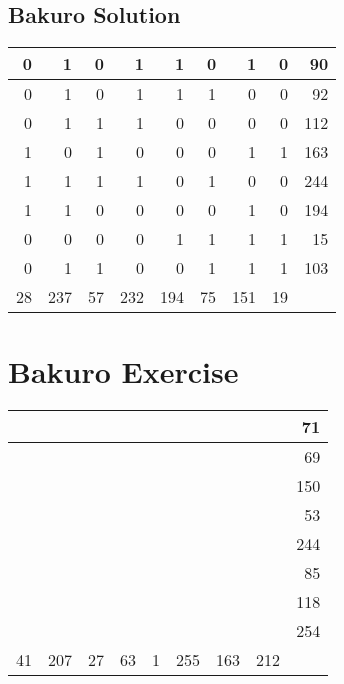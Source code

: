 \documentclass[]{article}
\begin{document}
 \subsection{Bakuro Solution} 
\begin{tabular}{rrrrrrrrr}
\hline
  0 &   1 &  0 &   1 &   1 &  0 &   1 &  0 &  90 \\ \hline
  0 &   1 &  0 &   1 &   1 &  1 &   0 &  0 &  92 \\ \hline
  0 &   1 &  1 &   1 &   0 &  0 &   0 &  0 & 112 \\ \hline
  1 &   0 &  1 &   0 &   0 &  0 &   1 &  1 & 163 \\ \hline
  1 &   1 &  1 &   1 &   0 &  1 &   0 &  0 & 244 \\ \hline
  1 &   1 &  0 &   0 &   0 &  0 &   1 &  0 & 194 \\ \hline
  0 &   0 &  0 &   0 &   1 &  1 &   1 &  1 &  15 \\ \hline
  0 &   1 &  1 &   0 &   0 &  1 &   1 &  1 & 103 \\ \hline
 28 & 237 & 57 & 232 & 194 & 75 & 151 & 19 &     \\ \hline
\hline
\end{tabular}\newpage\section{Bakuro Exercise}\begin{tabular}{rrrrrrrrr}
\hline
    &     &    &    &   &     &     &     &  71 \\ \hline
    &     &    &    &   &     &     &     &  69 \\ \hline
    &     &    &    &   &     &     &     & 150 \\ \hline
    &     &    &    &   &     &     &     &  53 \\ \hline
    &     &    &    &   &     &     &     & 244 \\ \hline
    &     &    &    &   &     &     &     &  85 \\ \hline
    &     &    &    &   &     &     &     & 118 \\ \hline
    &     &    &    &   &     &     &     & 254 \\ \hline
 41 & 207 & 27 & 63 & 1 & 255 & 163 & 212 &     \\ \hline
\hline
\end{tabular}\newpage 
\end{document}
